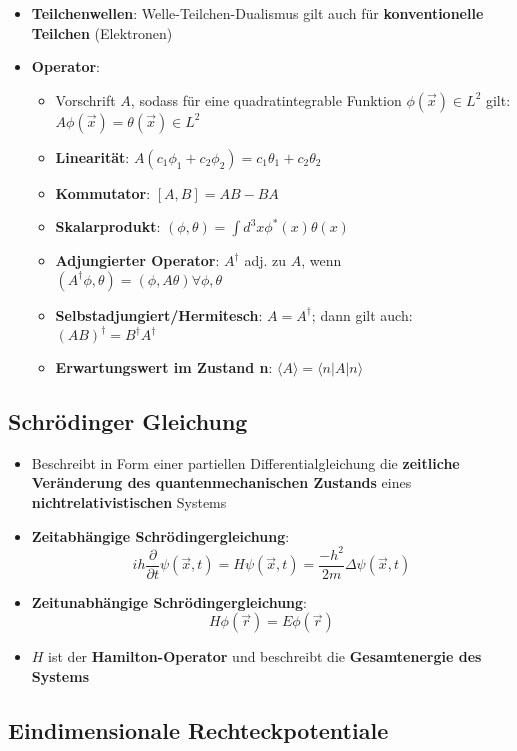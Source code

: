 \begin{itemize}
\begin{itemize}
	\end{itemize}
	\item \textbf{Teilchenwellen}: Welle-Teilchen-Dualismus gilt auch für \textbf{konventionelle Teilchen} (Elektronen)
	\item \textbf{Operator}:
	\begin{itemize}
		\item Vorschrift $A$, sodass für eine quadratintegrable Funktion $\phi(\vec{x}) \in L^2$ gilt: $A\phi(\vec{x}) = \theta(\vec{x}) \in L^2$
		\item \textbf{Linearität}: $A(c_1\phi_1 + c_2\phi_2) = c_1\theta_1 + c_2\theta_2$
		\item \textbf{Kommutator}: $[A, B] = AB - BA$
		\item \textbf{Skalarprodukt}: $(\phi, \theta) = \int d^3x\phi^*(x)\theta(x)$
		\item \textbf{Adjungierter Operator}: $A^\dagger$ adj. zu $A$, wenn $(A^\dagger\phi, \theta) = (\phi, A\theta) \forall \phi, \theta$
		\item \textbf{Selbstadjungiert/Hermitesch}: $A = A^\dagger$; dann gilt auch: $(AB)^\dagger = B^\dagger A^\dagger$
		\item \textbf{Erwartungswert im Zustand n}: $\langle A\rangle = \langle n | A | n \rangle$
	\end{itemize}
\end{itemize}

\subsection{Schrödinger Gleichung}
\label{quant:sub:schroedinger_gleichung}

\begin{itemize}
	\item Beschreibt in Form einer partiellen Differentialgleichung die \textbf{zeitliche Veränderung des quantenmechanischen Zustands} eines \textbf{nichtrelativistischen} Systems
	\item \textbf{Zeitabhängige Schrödingergleichung}:
	$$
		ih\frac{\partial}{\partial t}\psi(\vec{x},t) = H\psi(\vec{x}, t) = \frac{-h^2}{2m}\Delta\psi(\vec{x}, t)
	$$
	\item \textbf{Zeitunabhängige Schrödingergleichung}:
	$$
		H\phi(\vec{r}) = E\phi(\vec{r})
	$$
	\item $H$ ist der \textbf{Hamilton-Operator} und beschreibt die \textbf{Gesamtenergie des Systems}
\end{itemize}

\subsection{Eindimensionale Rechteckpotentiale}%
\label{quant:sub:eindimensionale_rechteckpotentiale}


